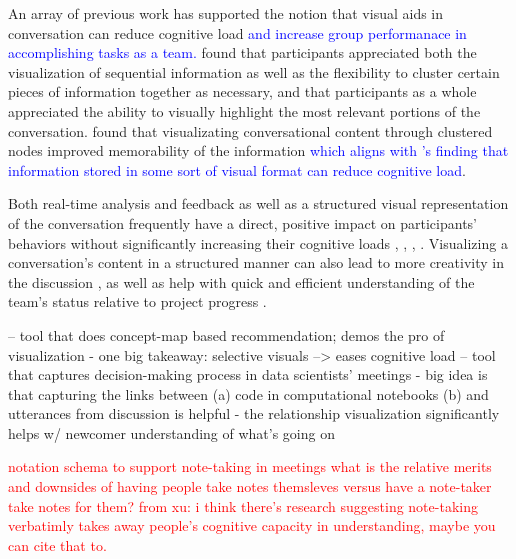 An array of previous work has supported the notion that visual aids in conversation can reduce cognitive load \textcolor{blue}{and increase group performanace in accomplishing tasks as a team.}
\cite{gumiennySupportingSynthesisInformation2014} found that participants appreciated both the visualization of sequential information as well as the flexibility to cluster certain pieces of information together as necessary, and that participants as a whole appreciated the ability to visually highlight the most relevant portions of the conversation.
\cite{HowDisplayGroup} found that visualizating conversational content through clustered nodes improved memorability of the information \textcolor{blue}{which aligns with \cite{kirshenbaum2021traces}'s finding that information stored in some sort of visual format can reduce cognitive load}.

Both real-time analysis and feedback as well as a structured visual representation of the conversation frequently have a direct, positive impact on participants' behaviors without significantly increasing their cognitive loads \cite{leshedVisualizingRealtimeLanguagebased2009}, \cite{yangCatchLiveRealtimeSummarization2022}, \cite{khadpeEmpathospherePromotingConstructive2022}, \cite{tangConceptGuideSupportingOnline2021}. Visualizing a conversation's content in a structured manner can also lead to more creativity in the discussion \cite{valkIdeationCompassSupporting2022}, as well as help with quick and efficient understanding of the team's status relative to project progress \cite{wangCallistoCapturingWhy2020}.  

\cite{tangConceptGuideSupportingOnline2021} -- tool that does concept-map based recommendation; demos the pro of visualization
    - one big takeaway: selective visuals --> eases cognitive load
\cite{wangCallistoCapturingWhy2020} -- tool that captures decision-making process in data scientists' meetings
    - big idea is that capturing the links between (a) code in computational notebooks (b) and utterances from discussion is helpful
    - the relationship visualization significantly helps w/ newcomer understanding of what's going on

\textcolor{red}{notation schema to support note-taking in meetings}
\textcolor{red}{what is the relative merits and downsides of having people take notes themsleves versus have a note-taker take notes for them? }
\textcolor{red}{from xu: i think there's research suggesting note-taking verbatimly takes away people's cognitive capacity in understanding, maybe you can cite that to.}

